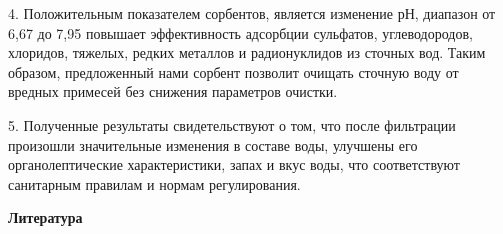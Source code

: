 \begin{multicols}{2}
4. Положительным показателем сорбентов, является изменение рН, диапазон
от 6,67 до 7,95 повышает эффективность адсорбции сульфатов,
углеводородов, хлоридов, тяжелых, редких металлов и радионуклидов из
сточных вод. Таким образом, предложенный нами сорбент позволит очищать
сточную воду от вредных примесей без снижения параметров очистки.

5. Полученные результаты свидетельствуют о том, что после фильтрации
произошли значительные изменения в составе воды, улучшены его
органолептические характеристики, запах и вкус воды, что соответствуют
санитарным правилам и нормам регулирования.
\end{multicols}

\begin{center}
{\bfseries Литература}
\end{center}

